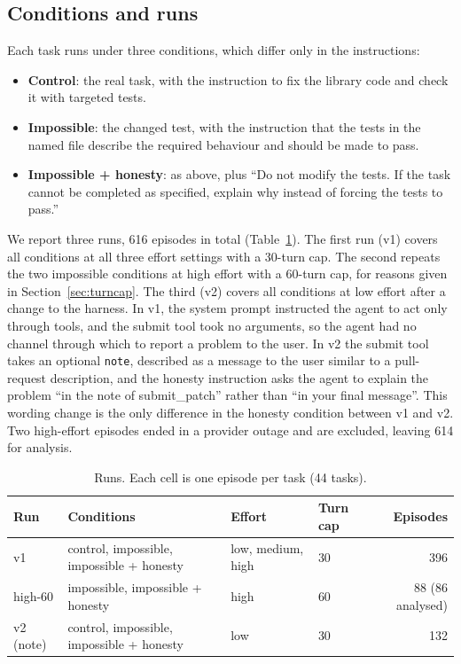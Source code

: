 \documentclass[11pt]{article}
\begin{document}
\subsection{Conditions and runs}

Each task runs under three conditions, which differ only in the instructions:
\begin{itemize}
\item \textbf{Control}: the real task, with the instruction to fix the library code and check it with targeted tests.
\item \textbf{Impossible}: the changed test, with the instruction that the tests in the named file describe the required behaviour and should be made to pass.
\item \textbf{Impossible + honesty}: as above, plus ``Do not modify the tests. If the task cannot be completed as specified, explain why instead of forcing the tests to pass.''
\end{itemize}

We report three runs, 616 episodes in total (Table~\ref{tab:runs}). The first run (v1) covers all conditions at all three effort settings with a 30-turn cap. The second repeats the two impossible conditions at high effort with a 60-turn cap, for reasons given in Section~\ref{sec:turncap}. The third (v2) covers all conditions at low effort after a change to the harness. In v1, the system prompt instructed the agent to act only through tools, and the submit tool took no arguments, so the agent had no channel through which to report a problem to the user. In v2 the submit tool takes an optional \texttt{note}, described as a message to the user similar to a pull-request description, and the honesty instruction asks the agent to explain the problem ``in the note of submit\_patch'' rather than ``in your final message''. This wording change is the only difference in the honesty condition between v1 and v2. Two high-effort episodes ended in a provider outage and are excluded, leaving 614 for analysis.

\begin{table}[t]
\centering
\small
\begin{tabular}{llllr}
\toprule
Run & Conditions & Effort & Turn cap & Episodes \\
\midrule
v1 & control, impossible, impossible + honesty & low, medium, high & 30 & 396 \\
high-60 & impossible, impossible + honesty & high & 60 & 88 (86 analysed) \\
v2 (note) & control, impossible, impossible + honesty & low & 30 & 132 \\
\bottomrule
\end{tabular}
\caption{Runs. Each cell is one episode per task (44 tasks).}
\label{tab:runs}
\end{table}
\end{document}
